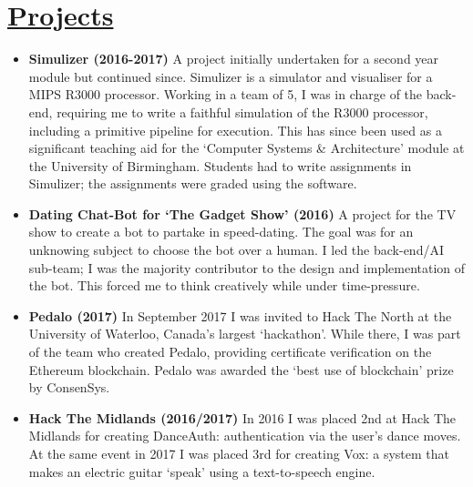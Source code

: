 \documentclass[11pt]{article}
\begin{document}
	\vspace{-20pt}
	\hspace{-100pt}\section*{\underline{Projects}} %
			\begin{itemize}
				\item \textbf{Simulizer (2016-2017)} A project initially undertaken for a second year module but continued since. Simulizer is a simulator and visualiser for a MIPS R3000 processor. Working in a team of 5, I was in charge of the back-end, requiring me to write a faithful simulation of the R3000 processor, including a primitive pipeline for execution. This has since been used as a significant teaching aid for the `Computer Systems \& Architecture' module at the University of Birmingham. Students had to write assignments in Simulizer; the assignments were graded using the software.
				\item \textbf{Dating Chat-Bot for `The Gadget Show' (2016)} A project for the TV show to create a bot to partake in speed-dating. The goal was for an unknowing subject to choose the bot over a human. I led the back-end/AI sub-team; I was the majority contributor to the design and implementation of the bot. This forced me to think creatively while under time-pressure.
				\item \textbf{Pedalo (2017)} In September 2017 I was invited to Hack The North at the University of Waterloo, Canada's largest `hackathon'. While there, I was part of the team who created Pedalo, providing certificate verification on the Ethereum blockchain. Pedalo was awarded the `best use of blockchain' prize by ConsenSys. 
				\item \textbf{Hack The Midlands (2016/2017)} In 2016 I was placed 2nd at Hack The Midlands for creating DanceAuth: authentication via the user's dance moves. At the same event in 2017 I was placed 3rd for creating Vox: a system that makes an electric guitar `speak' using a text-to-speech engine.
			\end{itemize}
\end{document}
